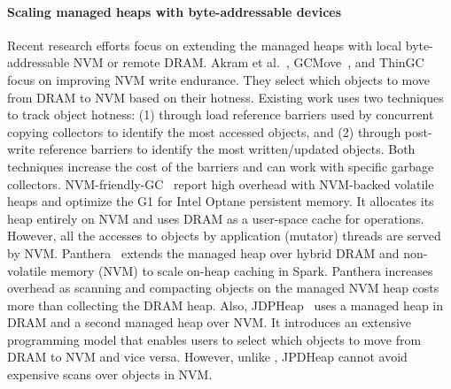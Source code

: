 \paragraph{\textbf{Scaling managed heaps with byte-addressable devices}}
Recent research efforts focus on extending the managed heaps with
local byte-addressable NVM or remote DRAM. Akram et
al.~\cite{akram:ration, akram:crystal}, GCMove~\cite{gcmove}, and
ThinGC~\cite{thingc} focus on improving NVM write endurance. They
select which objects to move from DRAM to NVM based on their hotness.
Existing work uses two techniques to track object hotness: (1) through
load reference barriers used by concurrent copying collectors to
identify the most accessed objects, and (2) through post-write
reference barriers to identify the most written/updated objects. Both
techniques increase the cost of the barriers and can work with
specific garbage collectors. NVM-friendly-GC~\cite{Xu:gc_evaluation}
report high \teraheapGC overhead with NVM-backed volatile heaps and optimize
the G1 \teraheapGC for Intel Optane persistent memory. It allocates its heap
entirely on NVM and uses DRAM as a user-space cache for \teraheapGC
operations. However, all the accesses to objects by application
(mutator) threads are served by NVM. Panthera~\cite{wang:Panthera}
extends the managed heap over hybrid DRAM and non-volatile memory
(NVM) to scale on-heap caching in Spark. Panthera increases \teraheapGC
overhead as scanning and compacting objects on the managed NVM heap
costs more than collecting the DRAM heap. Also,
JDPHeap~\cite{jpd_heap} uses a managed heap in DRAM and a second
managed heap over NVM. It introduces an extensive programming model
that enables users to select which objects to move from DRAM to NVM
and vice versa. However, unlike \teraheapName{}, JPDHeap cannot avoid
expensive \teraheapGC scans over objects in NVM.

